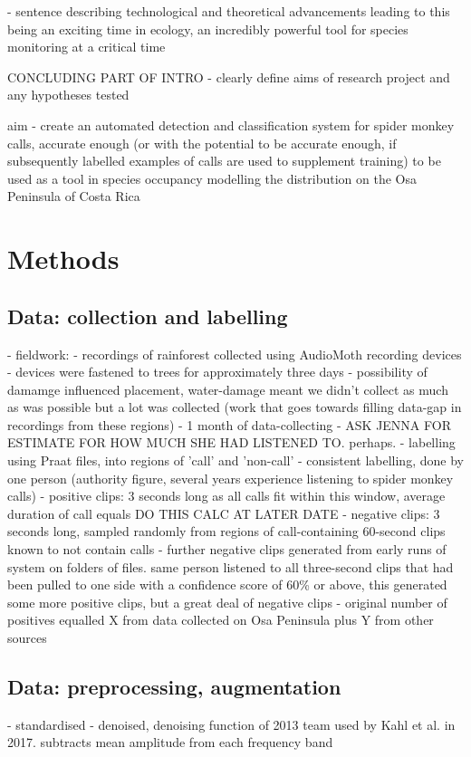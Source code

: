 \documentclass[11pt]{article}
\begin{document}
- sentence describing technological and theoretical advancements leading to this being an exciting time in ecology, an incredibly powerful tool for species monitoring at a critical time 




CONCLUDING PART OF INTRO - clearly define aims of research project and any hypotheses tested

aim - create an automated detection and classification system for spider monkey calls, accurate enough (or with the potential to be accurate enough, if subsequently labelled examples of calls are used to supplement training) to be used as a tool in species occupancy modelling the distribution on the Osa Peninsula of Costa Rica

	
\section{Methods} 
\subsection{Data: collection and labelling}
- fieldwork:
	- recordings of rainforest collected using AudioMoth recording devices
	- devices were fastened to trees for approximately three days
	- possibility of damamge influenced placement, water-damage meant we didn't collect as much as was possible but a lot was collected (work that goes towards filling data-gap in recordings from these regions)
	- 1 month of data-collecting
- ASK JENNA FOR ESTIMATE FOR HOW MUCH SHE HAD LISTENED TO. perhaps. 
- labelling using Praat files, into regions of 'call' and 'non-call'
- consistent labelling, done by one person (authority figure, several years experience listening to spider monkey calls)
- positive clips: 3 seconds long as all calls fit within this window, average duration of call equals DO THIS CALC AT LATER DATE
- negative clips: 3 seconds long, sampled randomly from regions of call-containing 60-second clips known to not contain calls  
- further negative clips generated from early runs of system on folders of files. same person listened to all three-second clips that had been pulled to one side with a confidence score of 60\% or above, this generated some more positive clips, but a great deal of negative clips 
- original number of positives equalled X from data collected on Osa Peninsula plus Y from other sources 
\subsection{Data: preprocessing, augmentation}
- standardised 
- denoised, denoising function of 2013 team used by Kahl et al. in 2017. subtracts mean amplitude from each frequency band
\end{document}
